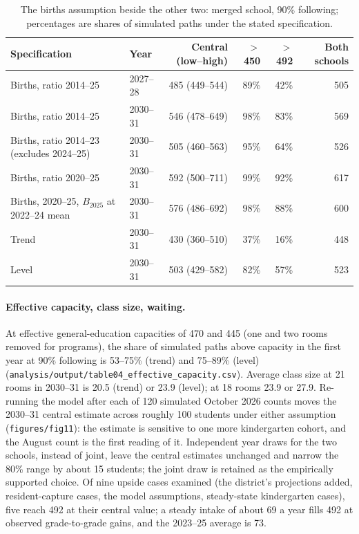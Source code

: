 \documentclass[11pt]{article}
\begin{document}
\begin{table}[htbp]\centering\footnotesize
\caption{The births assumption beside the other two: merged school, 90\% following; percentages are shares of simulated paths under the stated specification.}\label{tab:births}
\begin{tabular}{llrrrr}
\toprule
Specification & Year & Central (low--high) & $>$450 & $>$492 & Both schools \\
\midrule
Births, ratio 2014--25 & 2027--28 & 485 (449--544) & 89\% & 42\% & 505 \\
Births, ratio 2014--25 & 2030--31 & 546 (478--649) & 98\% & 83\% & 569 \\
Births, ratio 2014--23 (excludes 2024--25) & 2030--31 & 505 (460--563) & 95\% & 64\% & 526 \\
Births, ratio 2020--25 & 2030--31 & 592 (500--711) & 99\% & 92\% & 617 \\
Births, 2020--25, $B_{2025}$ at 2022--24 mean & 2030--31 & 576 (486--692) & 98\% & 88\% & 600 \\
Trend & 2030--31 & 430 (360--510) & 37\% & 16\% & 448 \\
Level & 2030--31 & 503 (429--582) & 82\% & 57\% & 523 \\
\bottomrule
\end{tabular}
\end{table}

\paragraph{Effective capacity, class size, waiting.} At effective general-education capacities of 470 and 445 (one and two rooms removed for programs), the share of simulated paths above capacity in the first year at 90\% following is 53--75\% (trend) and 75--89\% (level) (\texttt{analysis/output/table04\_effective\_capacity.csv}). Average class size at 21 rooms in 2030--31 is 20.5 (trend) or 23.9 (level); at 18 rooms 23.9 or 27.9. Re-running the model after each of 120 simulated October 2026 counts moves the 2030--31 central estimate across roughly 100 students under either assumption (\texttt{figures/fig11}): the estimate is sensitive to one more kindergarten cohort, and the August count is the first reading of it. Independent year draws for the two schools, instead of joint, leave the central estimates unchanged and narrow the 80\% range by about 15 students; the joint draw is retained as the empirically supported choice. Of nine upside cases examined (the district's projections added, resident-capture cases, the model assumptions, steady-state kindergarten cases), five reach 492 at their central value; a steady intake of about 69 a year fills 492 at observed grade-to-grade gains, and the 2023--25 average is 73.
\end{document}
